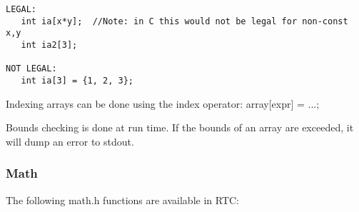 {\ttfamily \begin{verbatim}
LEGAL:
   int ia[x*y];  //Note: in C this would not be legal for non-const x,y
   int ia2[3];

NOT LEGAL:
   int ia[3] = {1, 2, 3};
\end{verbatim}
}

\noindent Indexing arrays can be done using the index operator:
array[expr] = ...;

\noindent Bounds checking is done at run time. If the bounds of an array are exceeded, 
it will dump an error to stdout. 

\subsubsection{Math}

The following math.h functions are available in RTC:

